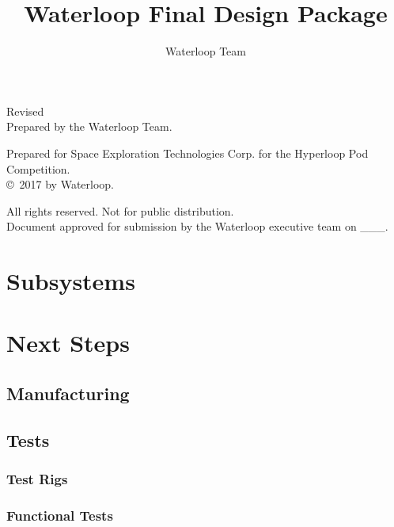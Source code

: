 \documentclass{report}
\author{Waterloop Team}
\title{Waterloop Final Design Package}
\date{\displaydate{date}}
\begin{document}
    \maketitle
    Revised \\

    Prepared by the Waterloop Team.

    Prepared for Space Exploration Technologies Corp. for the Hyperloop Pod Competition.\\

    \copyright \ 2017 by Waterloop.

    All rights reserved. Not for public distribution.\\

    Document approved for submission by the Waterloop executive team on \_\_\_.

    \tableofcontents
    \newpage

    
    


    \chapter{Subsystems}

    
    
    
    
    
    
    
    \chapter{Next Steps}

    \section{Manufacturing}
    \section{Tests}
    \subsection{Test Rigs}
    \subsection{Functional Tests}
\end{document}
